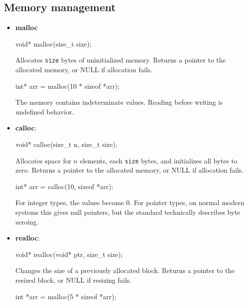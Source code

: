 \documentclass{report}
\begin{document}
    \subsection{Memory management}
    \begin{itemize}
        \item \textbf{malloc} 
            \bigbreak \noindent 
            \begin{cppcode}
            void* malloc(size_t size);
            \end{cppcode}
            \bigbreak \noindent 
            Allocates \texttt{size} bytes of uninitialized memory.
            \bigbreak \noindent 
            Returns a pointer to the allocated memory, or NULL if allocation fails.
            \bigbreak \noindent 
            \begin{cppcode}
            int* arr = malloc(10 * sizeof *arr);
            \end{cppcode}
            \bigbreak \noindent 
            The memory contains indeterminate values. Reading before writing is undefined behavior.
        \item \textbf{calloc}: 
            \bigbreak \noindent 
            \begin{cppcode}
            void* calloc(size_t n, size_t size);
            \end{cppcode}
            \bigbreak \noindent 
            Allocates space for $n$ elements, each \texttt{size} bytes, and initializes all bytes to zero.
            \bigbreak \noindent 
            Returns a pointer to the allocated memory, or NULL if allocation fails.
            \bigbreak \noindent 
            \begin{cppcode}
            int* arr = calloc(10, sizeof *arr);
            \end{cppcode}
            \bigbreak \noindent 
            For integer types, the values become 0. For pointer types, on normal modern systems this gives null pointers, but the standard technically describes byte zeroing.
        \item \textbf{realloc}: 
            \bigbreak \noindent 
            \begin{cppcode}
            void* realloc(void* ptr, size_t size);
            \end{cppcode}
            \bigbreak \noindent 
            Changes the size of a previously allocated block.
            \bigbreak \noindent 
            Returns a pointer to the resized block, or NULL if resizing fails.
            \bigbreak \noindent 
            \begin{cppcode}
                int *arr = malloc(5 * sizeof *arr);


\end{cppcode}
\end{itemize}
\end{document}
